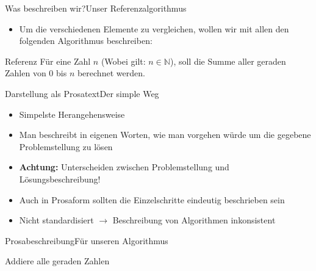 \begin{frame}{Was beschreiben wir?}{Unser Referenzalgorithmus}
    \begin{itemize}
        \item Um die verschiedenen Elemente zu vergleichen, wollen wir mit allen den folgenden Algorithmus beschreiben:
    \end{itemize}
    \pause
    \begin{alertblock}{Referenz}
        Für eine Zahl $n$ (Wobei gilt: $n \in \mathbb{N} $), soll die Summe aller geraden Zahlen von $0$ bis $n$ berechnet werden.
    \end{alertblock}
\end{frame}

\begin{frame}{Darstellung als Prosatext}{Der simple Weg}
    \begin{itemize}
        \item Simpelste Herangehensweise
        \item Man beschreibt in eigenen Worten, wie man vorgehen würde um die gegebene Problemstellung zu lösen
        \item \textbf{Achtung:} Unterscheiden zwischen Problemstellung und Lösungsbeschreibung!
        \item Auch in Prosaform sollten die Einzelschritte eindeutig beschrieben sein
        \item Nicht standardisiert $\rightarrow$ Beschreibung von Algorithmen inkonsistent
    \end{itemize}
\end{frame}

\begin{frame}{Prosabeschreibung}{Für unseren Algorithmus}
    \begin{alertblock}{Addiere alle geraden Zahlen}
    
    
      
    
    \end{alertblock}
\end{frame}

